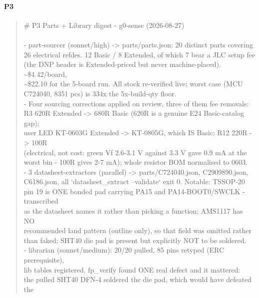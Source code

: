 \documentclass[11pt,a4paper]{article}
\begin{document}
\paragraph*{P3}
\begin{quote}\small\ttfamily\raggedright
\# P3 Parts + Library digest - g0-sense (2026-08-27)\\
~\\
- part-sourcer (sonnet/high) -\textgreater{} parts/parts.json: 20 distinct parts covering\\
  26 electrical refdes. 12 Basic / 8 Extended, of which 7 bear a JLC setup fee\\
  (the DNP header is Extended-priced but never machine-placed). \textasciitilde{}\$4.42/board,\\
  \textasciitilde{}\$22.10 for the 5-board run. All stock re-verified live; worst case (MCU\\
  C724040, 8351 pcs) is 334x the 5x-build-qty floor.\\
- Four sourcing corrections applied on review, three of them fee removals:\\
  R3 620R Extended -\textgreater{} 680R Basic (620R is a genuine E24 Basic-catalog gap);\\
  user LED KT-0603G Extended -\textgreater{} KT-0805G, which IS Basic; R12 220R -\textgreater{} 100R\\
  (electrical, not cost: green Vf 2.6-3.1 V against 3.3 V gave 0.9 mA at the\\
  worst bin - 100R gives 2-7 mA); whole resistor BOM normalised to 0603.\\
- 3 datasheet-extractors (parallel) -\textgreater{} parts/C724040.json, C2909890.json,\\
  C6186.json, all `datasheet\_extract --validate` exit 0. Notable: TSSOP-20\\
  pin 19 is ONE bonded pad carrying PA15 and PA14-BOOT0/SWCLK - transcribed\\
  as the datasheet names it rather than picking a function; AMS1117 has NO\\
  recommended land pattern (outline only), so that field was omitted rather\\
  than faked; SHT40 die pad is present but explicitly NOT to be soldered.\\
- librarian (sonnet/medium): 20/20 pulled, 85 pins retyped (ERC prerequisite),\\
  lib tables registered. fp\_verify found ONE real defect and it mattered:\\
  the pulled SHT40 DFN-4 soldered the die pad, which would have defeated the\\

\end{quote}
\end{document}
